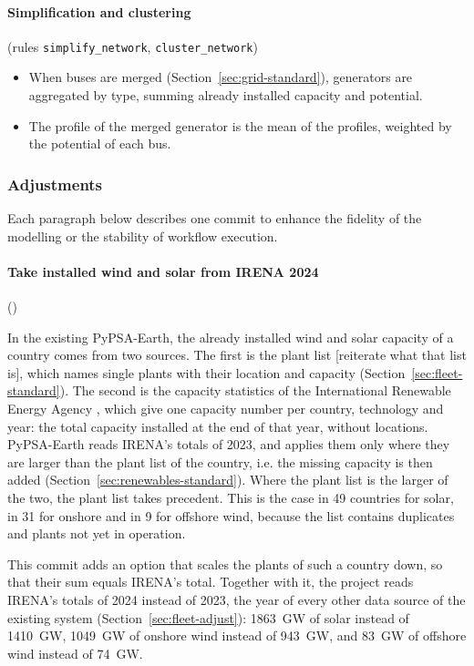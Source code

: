 \paragraph{Simplification and clustering} (rules \texttt{simplify\_network}, \texttt{cluster\_network})
\begin{itemize}[nosep,leftmargin=*]
  \item When buses are merged (Section~\ref{sec:grid-standard}), generators are aggregated by type, summing already installed capacity and potential.
  \item The profile of the merged generator is the mean of the profiles, weighted by the potential of each bus.
\end{itemize}

\subsubsection{Adjustments}\label{sec:renewables-adjust}

Each paragraph below describes one commit to enhance the fidelity of the modelling or the stability of workflow execution.

\paragraph{Take installed wind and solar from IRENA 2024} ()

In the existing PyPSA-Earth, the already installed wind and solar capacity of a country comes from two sources.
The first is the plant list [reiterate what that list is], which names single plants with their location and capacity (Section~\ref{sec:fleet-standard}).
The second is the capacity statistics of the International Renewable Energy Agency \citep{irenastat}, which give one capacity number per country, technology and year: the total capacity installed at the end of that year, without locations.
PyPSA-Earth reads IRENA's totals of 2023, and applies them only where they are larger than the plant list of the country, i.e. the missing capacity is then added (Section~\ref{sec:renewables-standard}).
Where the plant list is the larger of the two, the plant list takes precedent.
This is the case in 49 countries for solar, in 31 for onshore and in 9 for offshore wind, because the list contains duplicates and plants not yet in operation.

This commit adds an option that scales the plants of such a country down, so that their sum equals IRENA's total.
Together with it, the project reads IRENA's totals of 2024 instead of 2023, the year of every other data source of the existing system (Section~\ref{sec:fleet-adjust}): \SI{1863}{GW} of solar instead of \SI{1410}{GW}, \SI{1049}{GW} of onshore wind instead of \SI{943}{GW}, and \SI{83}{GW} of offshore wind instead of \SI{74}{GW}.

